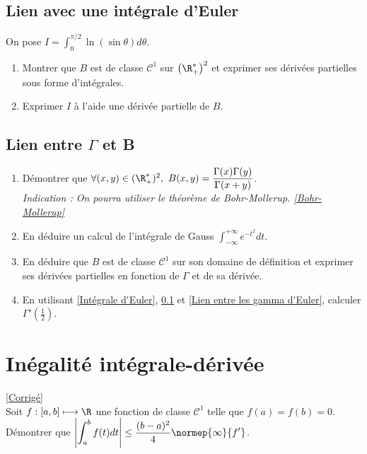 \documentclass{book}
\begin{document}
	\subsection{Lien avec une intégrale d'Euler}
	\label{Lien avec une intégrale d'Euler}
	On pose $I=\displaystyle\int_0^{\pi/2}\ln(\sin \theta)d\theta$.
	\begin{enumerate}
		\item Montrer que $B$ est de classe $\mathcal C^1$ sur $\left(\R^*_+\right)^2$ et exprimer ses dérivées partielles sous forme d'intégrales.
		\item Exprimer $I$ à l'aide une dérivée partielle de $B$.
	\end{enumerate}
	
	\subsection{Lien entre $\Gamma$ et B}
	\begin{enumerate}[leftmargin=*]
		\item Démontrer que $\forall (x,y)\in (\R^*_+)^2,\ B(x,y)=\displaystyle\frac{\Gamma(x)\Gamma(y)}{\Gamma(x+y)}$.\\
		\textit{Indication : On pourra utiliser le théorème de Bohr-Mollerup. \ref{Bohr-Mollerup}}
		\item En déduire un calcul de l'intégrale de Gauss $\displaystyle\int_{-\infty}^{+\infty}e^{-t^2}dt$.
		\item En déduire que $B$ est de classe $\mathcal C^1$ sur son domaine de définition et exprimer ses dérivées partielles en fonction de $\Gamma$ et de sa dérivée.
		\item En utilisant \ref{Intégrale d'Euler}, \ref{Lien avec une intégrale d'Euler} et \ref{Lien entre les gamma d'Euler}, calculer $\Gamma'\left(\displaystyle\frac{1}{2}\right)$.
	\end{enumerate}
	
	\section{Inégalité intégrale-dérivée}
	\textcolor{blue}{\hyperref[sec:inegalite-integrale-derivee-etoile1]{[Corrigé]}}\\
	\label{inegaliteintder}
	\label{Inégalité intégrale-dérivée}
	Soit $f:[a,b]\longmapsto \R $ une fonction de classe $\mathcal{C}^1$ telle que $f(a)=f(b)=0$.
	\\Démontrer que  $\displaystyle\left|\int_a^b f(t)dt \right|\leq \frac{(b-a)^2}{4}\normep{\infty}{f'}$.
	
\end{document}
